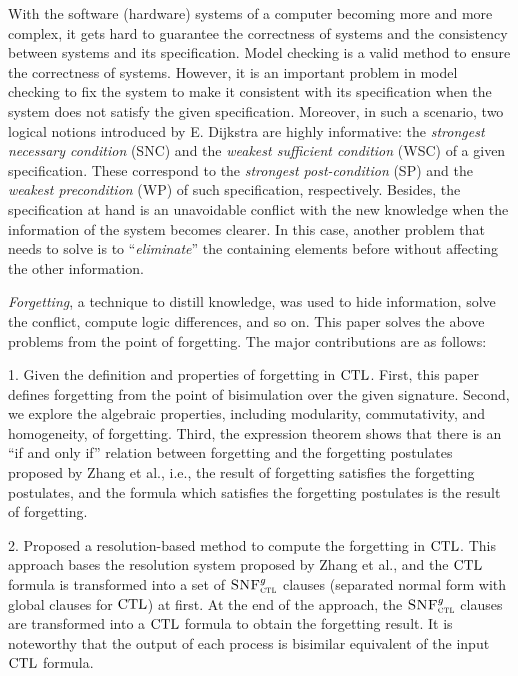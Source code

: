 \begin{englishabstract}
 With the software (hardware) systems of a computer becoming more and more complex, it gets hard to guarantee the correctness of systems and the consistency between systems and its specification.
Model checking is a valid method to ensure the correctness of systems. However, it is an important problem in model checking to fix the system to make it consistent with its specification when the system does not satisfy the given specification.
Moreover, in such a scenario, two logical notions introduced by E. Dijkstra are highly informative: the \emph{strongest necessary condition} (SNC) and the \emph{weakest sufficient condition}  (WSC)  of a given specification. These correspond to the \emph{strongest post-condition} (SP) and the \emph{weakest precondition} (WP) of such specification, respectively.
Besides, the specification at hand is an unavoidable conflict with the new knowledge when the information of the system becomes clearer. In this case, another problem that needs to solve is to ``\emph{eliminate}” the containing elements before without affecting the other information.

\emph{Forgetting}, a technique to distill knowledge, was used to hide information, solve the conflict, compute logic differences, and so on. This paper solves the above problems from the point of forgetting. The major contributions are as follows:

1. Given the definition and properties of forgetting in $\textrm{CTL}$. First, this paper defines forgetting from the point of bisimulation over the given signature. Second, we explore the algebraic properties, including modularity, commutativity, and homogeneity, of forgetting. Third, the expression theorem shows that there is an ``if and only if” relation between forgetting and the forgetting postulates proposed by Zhang et al., i.e., the result of forgetting satisfies the forgetting postulates, and the formula which satisfies the forgetting postulates is the result of forgetting.

2. Proposed a resolution-based method to compute the forgetting in $\textrm{CTL}$. This approach bases the resolution system proposed by Zhang et al., and the $\textrm{CTL}$ formula is transformed into a set of ${\textsc{SNF}_{\textsc{ctl}}^g}$ clauses (separated normal form with global clauses for $\textrm{CTL}$) at first. At the end of the approach, the ${\textsc{SNF}_{\textsc{ctl}}^g}$ clauses are transformed into a $\textrm{CTL}$ formula to obtain the forgetting result. It is noteworthy that the output of each process is bisimilar equivalent of the input $\textrm{CTL}$ formula.


\end{englishabstract}
